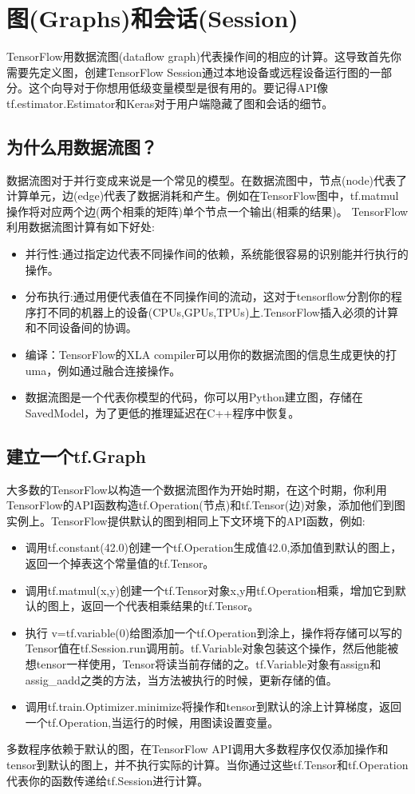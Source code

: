 \section{图(Graphs)和会话(Session)}
TensorFlow用数据流图(dataflow graph)代表操作间的相应的计算。这导致首先你需要先定义图，创建TensorFlow Session通过本地设备或远程设备运行图的一部分。这个向导对于你想用低级变量模型是很有用的。要记得API像tf.estimator.Estimator和Keras对于用户端隐藏了图和会话的细节。
\subsection{为什么用数据流图？}
数据流图对于并行变成来说是一个常见的模型。在数据流图中，节点(node)代表了计算单元，边(edge)代表了数据消耗和产生。例如在TensorFlow图中，tf.matmul操作将对应两个边(两个相乘的矩阵)单个节点一个输出(相乘的结果)。
TensorFlow利用数据流图计算有如下好处:
\begin{itemize}
\item 并行性:通过指定边代表不同操作间的依赖，系统能很容易的识别能并行执行的操作。
\item 分布执行:通过用便代表值在不同操作间的流动，这对于tensorflow分割你的程序打不同的机器上的设备(CPUs,GPUs,TPUs)上.TensorFlow插入必须的计算和不同设备间的协调。
\item 编译：TensorFlow的XLA compiler可以用你的数据流图的信息生成更快的打uma，例如通过融合连接操作。
\item 数据流图是一个代表你模型的代码，你可以用Python建立图，存储在SavedModel，为了更低的推理延迟在C++程序中恢复。
\end{itemize}
\subsection{建立一个tf.Graph}
大多数的TensorFlow以构造一个数据流图作为开始时期，在这个时期，你利用TensorFlow的API函数构造tf.Operation(节点)和tf.Tensor(边)对象，添加他们到图实例上。TensorFlow提供默认的图到相同上下文环境下的API函数，例如:
\begin{itemize}
\item 调用tf.constant(42.0)创建一个tf.Operation生成值42.0,添加值到默认的图上，返回一个掉表这个常量值的tf.Tensor。
\item 调用tf.matmul(x,y)创建一个tf.Tensor对象x,y用tf.Operation相乘，增加它到默认的图上，返回一个代表相乘结果的tf.Tensor。
\item 执行 v=tf.variable(0)给图添加一个tf.Operation到涂上，操作将存储可以写的Tensor值在tf.Session.run调用前。tf.Variable对象包装这个操作，然后他能被想tensor一样使用，Tensor将读当前存储的之。tf.Variable对象有assign和assig_aadd之类的方法，当方法被执行的时候，更新存储的值。
\item 调用tf.train.Optimizer.minimize将操作和tensor到默认的涂上计算梯度，返回一个tf.Operation,当运行的时候，用图读设置变量。
\end{itemize}
多数程序依赖于默认的图，在TensorFlow API调用大多数程序仅仅添加操作和tensor到默认的图上，并不执行实际的计算。当你通过这些tf.Tensor和tf.Operation代表你的函数传递给tf.Session进行计算。
